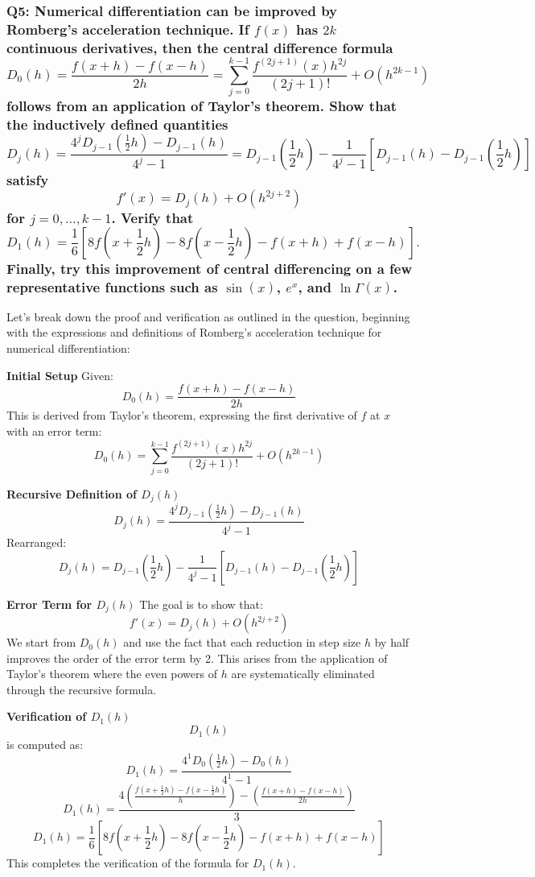 \documentclass[8pt]{article}
\begin{document}
\subsubsection*{Q5: Numerical differentiation can be improved by Romberg’s acceleration technique. If \( f(x) \) has \( 2k \) continuous derivatives, then the central difference formula
\[
D_0(h) = \frac{f(x+h) - f(x-h)}{2h} = \sum_{j=0}^{k-1} \frac{f^{(2j+1)}(x) h^{2j}}{(2j+1)!} + O(h^{2k-1})
\]
follows from an application of Taylor’s theorem. Show that the inductively defined quantities
\[
D_j(h) = \frac{4^j D_{j-1}(\frac{1}{2}h) - D_{j-1}(h)}{4^j - 1} = D_{j-1}(\frac{1}{2}h) - \frac{1}{4^j - 1} \left[D_{j-1}(h) - D_{j-1}(\frac{1}{2}h)\right]
\]
satisfy
\[
f'(x) = D_j(h) + O(h^{2j+2})
\]
for \( j = 0, \ldots, k-1 \). Verify that
\[
D_1(h) = \frac{1}{6} \left[ 8f(x+\frac{1}{2}h) - 8f(x-\frac{1}{2}h) - f(x+h) + f(x-h) \right].
\]
Finally, try this improvement of central differencing on a few representative functions such as \( \sin(x) \), \( e^x \), and \( \ln \Gamma(x) \).}

Let's break down the proof and verification as outlined in the question, beginning with the expressions and definitions of Romberg's acceleration technique for numerical differentiation:

\textbf{Initial Setup}
Given:
\[ D_0(h) = \frac{f(x+h) - f(x-h)}{2h} \]
This is derived from Taylor's theorem, expressing the first derivative of \( f \) at \( x \) with an error term:
\[ D_0(h) = \sum_{j=0}^{k-1} \frac{f^{(2j+1)}(x) h^{2j}}{(2j+1)!} + O(h^{2k-1}) \]

\textbf{Recursive Definition of \( D_j(h) \)}
\[ D_j(h) = \frac{4^j D_{j-1}(\frac{1}{2}h) - D_{j-1}(h)}{4^j - 1} \]
Rearranged:
\[ D_j(h) = D_{j-1}(\frac{1}{2}h) - \frac{1}{4^j - 1} \left[D_{j-1}(h) - D_{j-1}(\frac{1}{2}h)\right] \]

\textbf{Error Term for \( D_j(h) \)}
The goal is to show that:
\[ f'(x) = D_j(h) + O(h^{2j+2}) \]
We start from \( D_0(h) \) and use the fact that each reduction in step size \( h \) by half improves the order of the error term by 2. This arises from the application of Taylor’s theorem where the even powers of \( h \) are systematically eliminated through the recursive formula.

\textbf{Verification of \( D_1(h) \)}
\[ D_1(h) \] is computed as:
\[ D_1(h) = \frac{4^1 D_0(\frac{1}{2}h) - D_0(h)}{4^1 - 1} \]
\[ D_1(h) = \frac{4 \left(\frac{f(x+\frac{1}{2}h) - f(x-\frac{1}{2}h)}{h}\right) - \left(\frac{f(x+h) - f(x-h)}{2h}\right)}{3} \]
\[ D_1(h) = \frac{1}{6} \left[ 8f(x+\frac{1}{2}h) - 8f(x-\frac{1}{2}h) - f(x+h) + f(x-h) \right] \]
This completes the verification of the formula for \( D_1(h) \).
\end{document}
